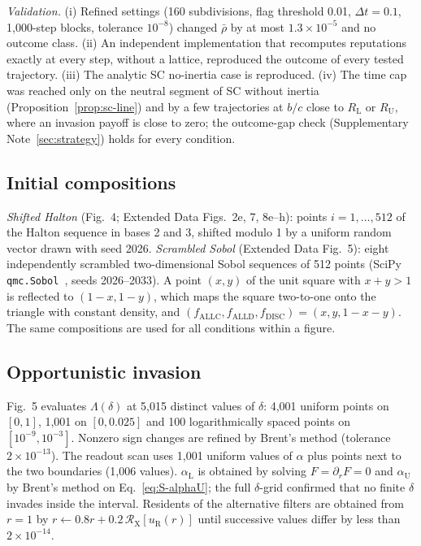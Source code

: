 \documentclass[fleqn,10pt]{article}
\theoremstyle{plain}
\theoremstyle{remark}
\newcommand{\FigDepth}{4}
\newcommand{\FigOpportunism}{5}
\newcommand{\EDResident}{2}
\newcommand{\EDRatio}{5}
\newcommand{\EDDepth}{7}
\newcommand{\EDReadout}{8}
\newcommand{\Rm}{\mathcal R}
\newcommand{\ALLC}{\mathrm{ALLC}}
\newcommand{\ALLD}{\mathrm{ALLD}}
\newcommand{\DISC}{\mathrm{DISC}}
\begin{document}
\emph{Validation.} (i) Refined settings (160 subdivisions, flag threshold 0.01,
$\Delta t=0.1$, 1,000-step blocks, tolerance $10^{-8}$) changed $\bar\rho$ by at most
$1.3\times10^{-5}$ and no outcome class. (ii) An independent implementation that
recomputes reputations exactly at every step, without a lattice, reproduced the
outcome of every tested trajectory. (iii) The analytic SC no-inertia case is
reproduced. (iv) The time cap was reached only on the neutral segment of SC
without inertia (Proposition~\ref{prop:sc-line}) and by a few trajectories at
$b/c$ close to $R_{\mathrm L}$ or $R_{\mathrm U}$, where an invasion payoff is close to
zero; the outcome-gap check (Supplementary Note~\ref{sec:strategy}) holds for
every condition.

\subsection{Initial compositions}
\emph{Shifted Halton} (Fig.~\FigDepth; Extended Data Figs.~\EDResident e,
\EDDepth, \EDReadout e--h): points $i=1,\dots,512$ of the Halton sequence in bases
2 and 3, shifted modulo 1 by a uniform random vector drawn with seed 2026.
\emph{Scrambled Sobol} (Extended Data Fig.~\EDRatio): eight independently
scrambled two-dimensional Sobol sequences of 512 points (SciPy
\texttt{qmc.Sobol}~\cite{virtanen2020}, seeds 2026--2033). A point $(x,y)$ of the
unit square with $x+y>1$ is reflected to $(1-x,1-y)$, which maps the square
two-to-one onto the triangle with constant density, and
$(f_{\ALLC},f_{\ALLD},f_{\DISC})=(x,y,1-x-y)$. The same compositions are used for
all conditions within a figure.

\subsection{Opportunistic invasion}
Fig.~\FigOpportunism{} evaluates $\Lambda(\delta)$ at 5,015 distinct values of
$\delta$: 4,001 uniform points on $[0,1]$, 1,001 on $[0,0.025]$ and 100
logarithmically spaced points on $[10^{-9},10^{-3}]$. Nonzero sign changes are
refined by Brent's method (tolerance $2\times10^{-13}$). The readout scan uses
1,001 uniform values of $\alpha$ plus points next to the two boundaries (1,006
values). $\alpha_{\mathrm L}$ is obtained by solving $F=\partial_rF=0$ and
$\alpha_{\mathrm U}$ by Brent's method on Eq.~\eqref{eq:S-alphaU}; the full
$\delta$-grid confirmed that no finite $\delta$ invades inside the interval.
Residents of the alternative filters are obtained from $r=1$ by
$r\leftarrow0.8r+0.2\,\Rm_{\mathrm X}[u_{\mathrm R}(r)]$ until successive values differ
by less than $2\times10^{-14}$.
\end{document}
